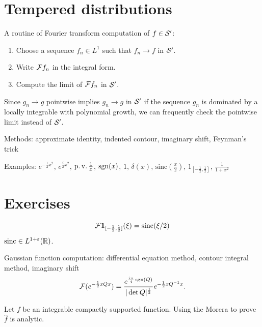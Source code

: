 \documentclass{../../large}
\begin{document}
\section{Tempered distributions}


A routine of Fourier transform computation of $f\in\mathcal{S}'$:
\begin{enumerate}
\item Choose a sequence $f_n\in L^1$ such that $f_n\to f$ in $\mathcal{S}'$.
\item Write $\mathcal{F} f_n$ in the integral form.
\item Compute the limit of $\mathcal{F} f_n$ in $\mathcal{S}'$.
\end{enumerate}
Since $g_n\to g$ pointwise implies $g_n\to g$ in $\mathcal{S}'$ if the sequence $g_n$ is dominated by a locally integrable with polynomial growth, we can frequently check the pointwise limit instead of $\mathcal{S}'$.

Methods: approximate identity, indented contour, imaginary shift, Feynman's trick

Examples: $e^{-\frac12x^2}$, $e^{\frac i2x^2}$, $\operatorname{p.v.}\frac1x$, $\operatorname{sgn}(x)$, $1$, $\delta(x)$, $\mathrm{sinc}(\frac x2)$, $1_{[-\frac12,\frac12]}$, $\frac1{1+x^2}$



\section*{Exercises}
\begin{prb}
\[\mathcal{F}\mathbf{1}_{[-\frac12,\frac12]}(\xi)=\operatorname{sinc}(\xi/2)\]
$\operatorname{sinc}\in L^{1+\varepsilon}(\mathbb{R})$.
\end{prb}
\begin{prb}
Gaussian function computation:
differential equation method, contour integral method, imaginary shift
\[\mathcal{F}(e^{-\frac12xQx})=\frac{e^{\frac{i\pi}4\operatorname{sgn}(Q)}}{|\det Q|^{\frac12}}e^{-\frac12xQ^{-1}x}.\]
\end{prb}
\begin{prb}
\end{prb}
\begin{prb}
\end{prb}



\begin{prb}
Let $f$ be an integrable compactly supported function.
Using the Morera to prove $\hat f$ is analytic.

\end{prb}
\end{document}
